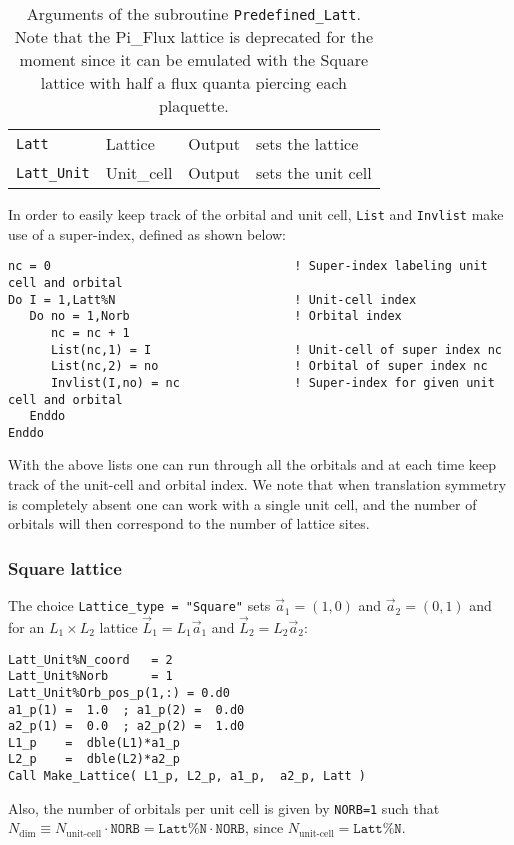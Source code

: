 \begin{table}[h]
\begin{center}
\begin{tabular}{@{} p{}  p{} p{} p{}  @{}}
		\texttt{Latt}            & Lattice    & Output &  sets the lattice\\
		\texttt{Latt\_Unit}      & Unit\_cell & Output & sets the unit cell\\
		\bottomrule
	\end{tabular}
\caption{Arguments of the subroutine \texttt{Predefined\_Latt}.   Note that the Pi\_Flux lattice is deprecated for the moment since it can be emulated with the Square lattice with half a flux quanta piercing each plaquette.}		\label{table:predefined_lattices}
\end{center}
\end{table}

In order to easily keep track of the orbital and unit cell, \texttt{List} and \texttt{Invlist} make use of a super-index, defined as shown below:
\begin{lstlisting}[style=fortran]
nc = 0                                  ! Super-index labeling unit cell and orbital
Do I = 1,Latt%N                         ! Unit-cell index 
   Do no = 1,Norb                       ! Orbital index
      nc = nc + 1
      List(nc,1) = I                    ! Unit-cell of super index nc
      List(nc,2) = no                   ! Orbital of super index nc
      Invlist(I,no) = nc                ! Super-index for given unit cell and orbital
   Enddo
Enddo
\end{lstlisting}
With the above lists one can run through all the orbitals and at each time keep track of the unit-cell and orbital index. We note that when translation symmetry is completely absent one can work with a single unit cell, and the number of orbitals will then correspond to the number of lattice sites. 

\subsubsection{Square lattice}

The choice \texttt{Lattice\_type = "Square"}   sets $\vec{a}_1 =  (1,0) $ and $\vec{a}_2 =  (0,1) $  and for an $L_1 \times L_2$  lattice  $\vec{L}_1 = L_1 \vec{a}_1$ and  $\vec{L}_2 = L_2 \vec{a}_2$:
\begin{lstlisting}[style=fortran]
Latt_Unit%N_coord   = 2
Latt_Unit%Norb      = 1
Latt_Unit%Orb_pos_p(1,:) = 0.d0 
a1_p(1) =  1.0  ; a1_p(2) =  0.d0
a2_p(1) =  0.0  ; a2_p(2) =  1.d0
L1_p    =  dble(L1)*a1_p
L2_p    =  dble(L2)*a2_p
Call Make_Lattice( L1_p, L2_p, a1_p,  a2_p, Latt )
\end{lstlisting}
Also, the number of orbitals per unit cell is given by \texttt{NORB=1} such that   $N_{\mathrm{dim}}   \equiv N_{\text{unit-cell}}   \cdot \texttt{NORB}  = \texttt{Latt\%N} \cdot \texttt{NORB}$, since $N_{\text{unit-cell}} = \texttt{Latt\%N}$.

